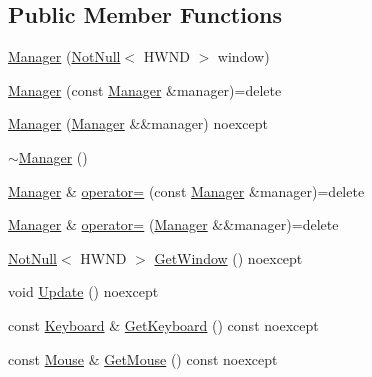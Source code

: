 \subsection*{Public Member Functions}
\begin{DoxyCompactItemize}
\item 
\mbox{\hyperlink{classmage_1_1input_1_1_manager_a58ecd18389d84fb46109f3b28d105879}{Manager}} (\mbox{\hyperlink{namespacemage_a8769f9d670d6b585ea306cb1062af94b}{Not\+Null}}$<$ H\+W\+ND $>$ window)
\item 
\mbox{\hyperlink{classmage_1_1input_1_1_manager_a345b3b9384e5a3f31ff183e5208fa56b}{Manager}} (const \mbox{\hyperlink{classmage_1_1input_1_1_manager}{Manager}} \&manager)=delete
\item 
\mbox{\hyperlink{classmage_1_1input_1_1_manager_ab4aae9f96e63bdb8d4ab0de08932b2eb}{Manager}} (\mbox{\hyperlink{classmage_1_1input_1_1_manager}{Manager}} \&\&manager) noexcept
\item 
\mbox{\hyperlink{classmage_1_1input_1_1_manager_a2fa35df15cecee8c6842e97912f80edd}{$\sim$\+Manager}} ()
\item 
\mbox{\hyperlink{classmage_1_1input_1_1_manager}{Manager}} \& \mbox{\hyperlink{classmage_1_1input_1_1_manager_a5fb8b5797f2048cf31fb4c2a05ba5d02}{operator=}} (const \mbox{\hyperlink{classmage_1_1input_1_1_manager}{Manager}} \&manager)=delete
\item 
\mbox{\hyperlink{classmage_1_1input_1_1_manager}{Manager}} \& \mbox{\hyperlink{classmage_1_1input_1_1_manager_a09047a5d857027368bc731763f8b5ece}{operator=}} (\mbox{\hyperlink{classmage_1_1input_1_1_manager}{Manager}} \&\&manager)=delete
\item 
\mbox{\hyperlink{namespacemage_a8769f9d670d6b585ea306cb1062af94b}{Not\+Null}}$<$ H\+W\+ND $>$ \mbox{\hyperlink{classmage_1_1input_1_1_manager_aca0295dd551eba67329740599a80f24d}{Get\+Window}} () noexcept
\item 
void \mbox{\hyperlink{classmage_1_1input_1_1_manager_a89934adcb3da215d5162bd0d30e48a9d}{Update}} () noexcept
\item 
const \mbox{\hyperlink{classmage_1_1input_1_1_keyboard}{Keyboard}} \& \mbox{\hyperlink{classmage_1_1input_1_1_manager_abd444400d2540d8cb4615cc7c47a72dd}{Get\+Keyboard}} () const noexcept
\item 
const \mbox{\hyperlink{classmage_1_1input_1_1_mouse}{Mouse}} \& \mbox{\hyperlink{classmage_1_1input_1_1_manager_a30cc36d7250842522b34a76e3f785f8a}{Get\+Mouse}} () const noexcept
\end{DoxyCompactItemize}
